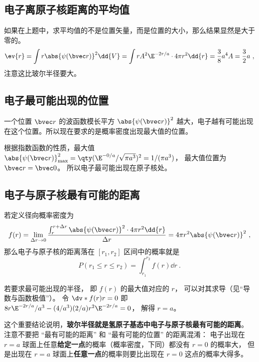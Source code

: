 \subsection{电子离原子核距离的平均值}

如果在上题中，求平均值的不是位置矢量，而是位置的大小，那么结果显然是大于零的。
\begin{equation}
\ev{r} = \int r \abs{\psi (\bvec r)}^2 \dd{V} = \int r A^2 \E^{-2r/a} \cdot 4\pi r^2 \dd{r} = \frac{3}{8} a^4 A = \frac{3}{2}a~,
\end{equation}
注意这比玻尔半径要大。

\subsection{电子最可能出现的位置}

一个位置 $\bvec r$ 的波函数模长平方 $\abs{\psi(\bvec r)}^2$ 越大，电子越有可能出现在这个位置。所以现在要求的是概率密度出现最大值的位置。
 
根据指数函数的性质，最大值 $\abs{\psi (\bvec r)}_{\max}^2 = \qty( \E^{-0/a}/\sqrt{\pi a^3})^2 = 1/(\pi a^3)$， 最大值位置为 $\bvec r = \bvec 0$。 所以电子最可能出现在原子核处。

\subsection{电子与原子核最有可能的距离}
若定义径向概率密度为
\begin{equation}\label{eq_HWF0_1}
f(r) = \lim_{\Delta r \to 0} \frac{\int_r^{r + \Delta r} {\abs{\psi (\bvec r)}}^2 \cdot 4\pi r^2 \dd{r} }{\Delta r} = 4\pi r^2 \abs{\psi(\bvec r)}^2~,
\end{equation}
那么电子与原子核的距离落在 $[r_1, r_2]$ 区间中的概率就是
\begin{equation}
P(r_1 \le r \le r_2) = \int_{r_1}^{r_2} f(r) \dd{r}~.
\end{equation}

若要求最可能出现的半径， 即 $f(r)$ 的最大值对应的 $r$， 可以对其求导（见“导数与函数极值”）。 令 $\dv*{f(r)}{r} = 0$ 即 $8 r \E^{-2r/a}/a^3 - (4/a^3)(2/a)r^2 \E^{-2r/a} = 0$， 解得 $r = a$。 
 
这个重要结论说明，\textbf{玻尔半径就是氢原子基态中电子与原子核最有可能的距离}。 注意不要把 “最有可能的距离” 和 “最有可能的位置” 的距离混淆： 电子出现在 $r = a$ 球面上任意\textbf{给定一点}的概率（概率密度，下同）都没有 $r = 0$ 的概率大， 但是出现在 $r = a$ 球面上\textbf{任意一点}的概率则要比出现在 $r = 0$ 这点的概率大得多。
